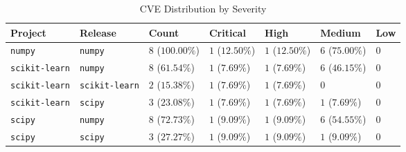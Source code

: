 \begin{table}
\caption{CVE Distribution by Severity}
\label{tab:cve-distribution}
\begin{tabular}{lllllll}
\toprule
Project & Release & Count & Critical & High & Medium & Low \\
\midrule
\texttt{numpy} & \texttt{numpy} & $8$ ($100.00\%$) & $1$ ($12.50\%$) & $1$ ($12.50\%$) & $6$ ($75.00\%$) & $0$ \\
\texttt{scikit-learn} & \texttt{numpy} & $8$ ($61.54\%$) & $1$ ($7.69\%$) & $1$ ($7.69\%$) & $6$ ($46.15\%$) & $0$ \\
\texttt{scikit-learn} & \texttt{scikit-learn} & $2$ ($15.38\%$) & $1$ ($7.69\%$) & $1$ ($7.69\%$) & $0$ & $0$ \\
\texttt{scikit-learn} & \texttt{scipy} & $3$ ($23.08\%$) & $1$ ($7.69\%$) & $1$ ($7.69\%$) & $1$ ($7.69\%$) & $0$ \\
\texttt{scipy} & \texttt{numpy} & $8$ ($72.73\%$) & $1$ ($9.09\%$) & $1$ ($9.09\%$) & $6$ ($54.55\%$) & $0$ \\
\texttt{scipy} & \texttt{scipy} & $3$ ($27.27\%$) & $1$ ($9.09\%$) & $1$ ($9.09\%$) & $1$ ($9.09\%$) & $0$ \\
\bottomrule
\end{tabular}
\end{table}
